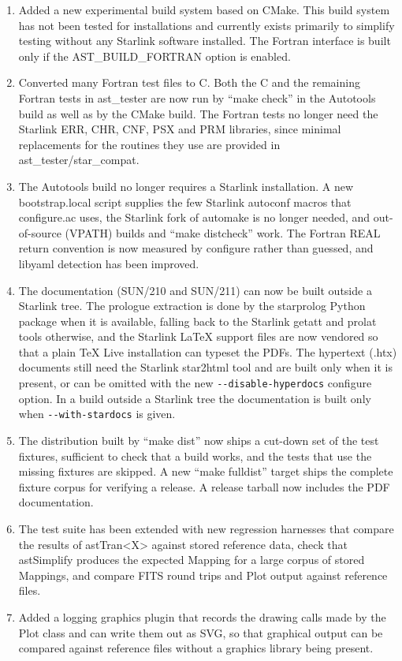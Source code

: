 \documentclass[twoside,11pt]{starlink}
\begin{document}
\begin{enumerate}
\item Added a new experimental build system based on CMake.
  This build system has not been tested for installations and currently exists primarily to simplify testing without any Starlink software installed.
  The Fortran interface is built only if the AST\_BUILD\_FORTRAN option is enabled.
\item Converted many Fortran test files to C.
  Both the C and the remaining Fortran tests in ast\_tester are now run by ``make check'' in the Autotools build as well as by the CMake build.
  The Fortran tests no longer need the Starlink ERR, CHR, CNF, PSX and PRM libraries, since minimal replacements for the routines they use are provided in ast\_tester/star\_compat.
\item The Autotools build no longer requires a Starlink installation.
  A new bootstrap.local script supplies the few Starlink autoconf macros that configure.ac uses, the Starlink fork of automake is no longer needed, and out-of-source (VPATH) builds and ``make distcheck'' work.
  The Fortran REAL return convention is now measured by configure rather than guessed, and libyaml detection has been improved.
\item The documentation (SUN/210 and SUN/211) can now be built outside a Starlink tree.
  The prologue extraction is done by the starprolog Python package when it is available, falling back to the Starlink getatt and prolat tools otherwise, and the Starlink LaTeX support files are now vendored so that a plain TeX Live installation can typeset the PDFs.
  The hypertext (.htx) documents still need the Starlink star2html tool and are built only when it is present, or can be omitted with the new \texttt{-{}-disable-hyperdocs} configure option.
  In a build outside a Starlink tree the documentation is built only when \texttt{-{}-with-stardocs} is given.
\item The distribution built by ``make dist'' now ships a cut-down set of the test fixtures, sufficient to check that a build works, and the tests that use the missing fixtures are skipped.
  A new ``make fulldist'' target ships the complete fixture corpus for verifying a release.
  A release tarball now includes the PDF documentation.
\item The test suite has been extended with new regression harnesses that compare the results of astTran<X> against stored reference data, check that astSimplify produces the expected Mapping for a large corpus of stored Mappings, and compare FITS round trips and Plot output against reference files.
\item Added a logging graphics plugin that records the drawing calls made by the Plot class and can write them out as SVG, so that graphical output can be compared against reference files without a graphics library being present.
\end{enumerate}
\end{document}
